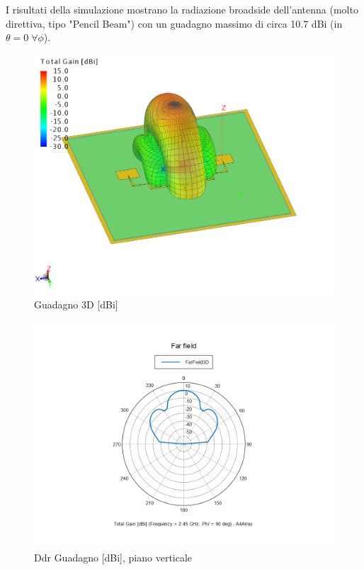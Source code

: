 \documentclass[twoside,twocolumn]{article}
\begin{document}
I risultati della simulazione mostrano la radiazione broadside  dell'antenna (molto direttiva, tipo "Pencil Beam") con un guadagno massimo di circa 10.7 dBi  (in $\theta =0 \; \forall \phi$).\newline
\begin{figure}[h!]
  \includegraphics[width=\linewidth]{Array4E_Gain.png}
  \caption{Guadagno 3D [dBi]}
  \label{fig:Array4E_Gain}
\end{figure}
\begin{figure}[h!]
  \includegraphics[width=\linewidth]{Array4E_verticale.png}
  \caption{Ddr Guadagno [dBi], piano verticale}
  \label{fig:Array4E_verticale}
\end{figure}
\end{document}
